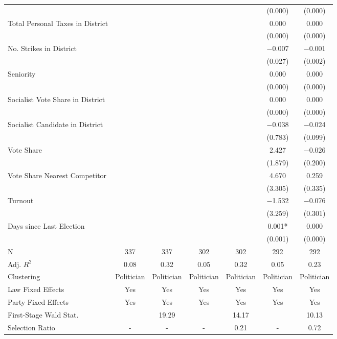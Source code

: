 \begin{table}[!h]
{\begin{threeparttable}
\begin{tabular}[t]{lcccccc}
 &  &  &  &  & (\num{0.000}) & \vphantom{3} (\num{0.000})\\
Total Personal Taxes in District &  &  &  &  & \num{0.000} & \num{0.000}\\
 &  &  &  &  & (\num{0.000}) & \vphantom{2} (\num{0.000})\\
No. Strikes in District &  &  &  &  & \num{-0.007} & \num{-0.001}\\
 &  &  &  &  & (\num{0.027}) & (\num{0.002})\\
Seniority &  &  &  &  & \num{0.000} & \num{0.000}\\
 &  &  &  &  & (\num{0.000}) & \vphantom{1} (\num{0.000})\\
Socialist Vote Share in District &  &  &  &  & \num{0.000} & \num{0.000}\\
 &  &  &  &  & (\num{0.000}) & (\num{0.000})\\
Socialist Candidate in District &  &  &  &  & \num{-0.038} & \num{-0.024}\\
 &  &  &  &  & (\num{0.783}) & (\num{0.099})\\
Vote Share &  &  &  &  & \num{2.427} & \num{-0.026}\\
 &  &  &  &  & (\num{1.879}) & (\num{0.200})\\
Vote Share Nearest Competitor &  &  &  &  & \num{4.670} & \num{0.259}\\
 &  &  &  &  & (\num{3.305}) & (\num{0.335})\\
Turnout &  &  &  &  & \num{-1.532} & \num{-0.076}\\
 &  &  &  &  & (\num{3.259}) & (\num{0.301})\\
Days since Last Election &  &  &  &  & \num{0.001}* & \num{0.000}\\
 &  &  &  &  & (\num{0.001}) & (\num{0.000})\\
\midrule
N & \num{337} & \num{337} & \num{302} & \num{302} & \num{292} & \num{292}\\
Adj. $R^2$ & \num{0.08} & \num{0.32} & \num{0.05} & \num{0.32} & \num{0.05} & \num{0.23}\\
Clustering & Politician & Politician & Politician & Politician & Politician & Politician\\
Law Fixed Effects & Yes & Yes & Yes & Yes & Yes & Yes\\
Party Fixed Effects & Yes & Yes & Yes & Yes & Yes & Yes\\
First-Stage Wald Stat. &  & 19.29 &  & 14.17 &  & 10.13\\
Selection Ratio & - & - & - & 0.21 & - & 0.72\\

\end{tabular}
\end{threeparttable}}
\end{table}
